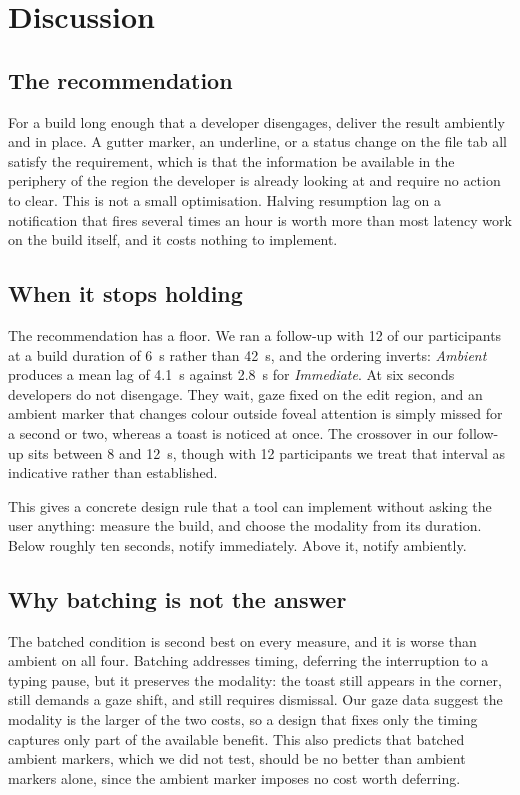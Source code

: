 \section{Discussion}
\label{sec:discussion}

\subsection{The recommendation}

For a build long enough that a developer disengages, deliver the result
ambiently and in place. A gutter marker, an underline, or a status change on
the file tab all satisfy the requirement, which is that the information be
available in the periphery of the region the developer is already looking at
and require no action to clear. This is not a small optimisation. Halving
resumption lag on a notification that fires several times an hour is worth more
than most latency work on the build itself, and it costs nothing to implement.

\subsection{When it stops holding}

The recommendation has a floor. We ran a follow-up with 12 of our participants
at a build duration of 6~s rather than 42~s, and the ordering inverts:
\emph{Ambient} produces a mean lag of 4.1~s against 2.8~s for
\emph{Immediate}. At six seconds developers do not disengage. They wait, gaze
fixed on the edit region, and an ambient marker that changes colour outside
foveal attention is simply missed for a second or two, whereas a toast is
noticed at once. The crossover in our follow-up sits between 8 and 12~s,
though with 12 participants we treat that interval as indicative rather than
established.

This gives a concrete design rule that a tool can implement without asking the
user anything: measure the build, and choose the modality from its duration.
Below roughly ten seconds, notify immediately. Above it, notify ambiently.

\subsection{Why batching is not the answer}

The batched condition is second best on every measure, and it is worse than
ambient on all four. Batching addresses timing, deferring the interruption to a
typing pause, but it preserves the modality: the toast still appears in the
corner, still demands a gaze shift, and still requires dismissal. Our gaze data
suggest the modality is the larger of the two costs, so a design that fixes
only the timing captures only part of the available benefit. This also predicts
that batched ambient markers, which we did not test, should be no better than
ambient markers alone, since the ambient marker imposes no cost worth deferring.

